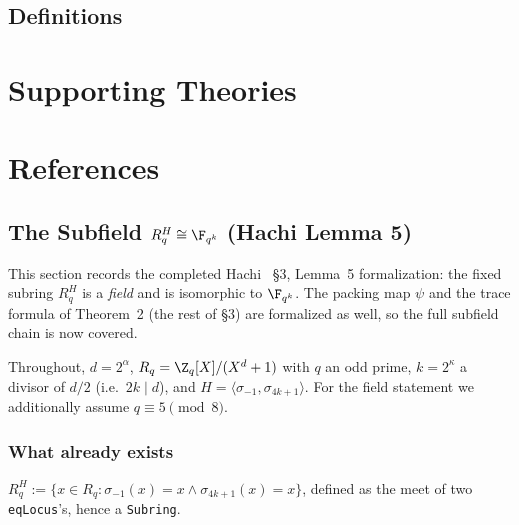 \section{Definitions}





\chapter{Supporting Theories}\label{chap:supporting_theories}









\chapter{References}\label{chap:references}


\section{The Subfield \texorpdfstring{$R_q^H \cong \F_{q^k}$}{R\_q\^{}H ≅ F\_(q\^{}k)} (Hachi Lemma 5)}\label{sec:hachi_subfield}

This section records the completed Hachi~\cite{NOZ26} \S3, Lemma~5 formalization:
the fixed subring $R_q^H$ is a \emph{field} and is isomorphic to $\F_{q^k}$.
The packing map $\psi$ and the trace formula of Theorem~2 (the rest of \S3) are formalized as
well, so the full subfield chain is now covered.

Throughout, $d = 2^\alpha$, $R_q = \Z_q[X]/(X^{d}+1)$ with $q$ an odd prime, $k = 2^\kappa$ a
divisor of $d/2$ (i.e.\ $2k \mid d$), and $H = \langle \sigma_{-1}, \sigma_{4k+1}\rangle$.
For the field statement we additionally assume $q \equiv 5 \pmod 8$.

\subsection{What already exists}

\begin{definition}\label{def:fixedSubring}
\leanok
$R_q^H := \{x \in R_q : \sigma_{-1}(x) = x \wedge \sigma_{4k+1}(x) = x\}$, defined as the meet of
two \texttt{eqLocus}'s, hence a \texttt{Subring}.
\end{definition}

